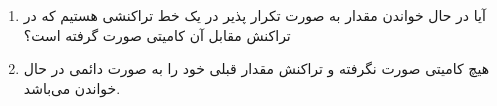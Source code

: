 \documentclass[a4paper]{article}
\begin{document}
\begin{enumerate}
    \item  آیا در حال خواندن مقدار به صورت تکرار پذیر در یک خط تراکنشی هستیم که
    در تراکنش مقابل آن کامیتی صورت گرفته است؟
    \begin{LTR}
        \begin{table}[h]
            \centering
        \end{table}
    \end{LTR}

    \item هیچ کامیتی صورت نگرفته و تراکنش مقدار قبلی خود را به صورت دائمی در حال
    خواندن می‌باشد.
    \begin{LTR}
        \begin{table}[h]
            \centering
        \end{table}
    \end{LTR}
\end{enumerate}
\end{document}
